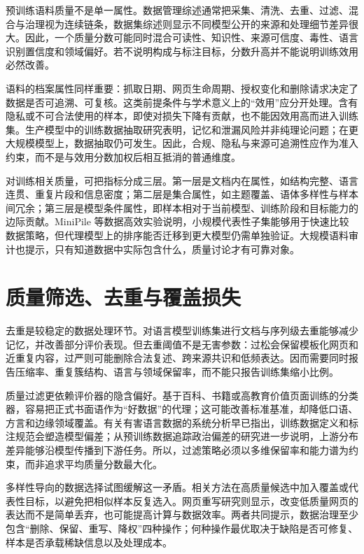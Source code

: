 \documentclass[11pt,a4paper]{article}
\begin{document}
预训练语料质量不是单一属性。数据管理综述通常把采集、清洗、去重、过滤、混合与治理视为连续链条\cite{datamanagementfor2023}，数据集综述则显示不同模型公开的来源和处理细节差异很大\cite{datasetsforlarge2024}。因此，一个质量分数可能同时混合可读性、知识性、来源可信度、毒性、语言识别置信度和领域偏好。若不说明构成与标注目标，分数升高并不能说明训练效用必然改善。

语料的档案属性同样重要：抓取日期、网页生命周期、授权变化和删除请求决定了数据是否可追溯、可复核\cite{anarchivalperspective2024}。这类前提条件与学术意义上的“效用”应分开处理。含有隐私或不可合法使用的样本，即使对损失下降有贡献，也不能因效用高而进入训练集。生产模型中的训练数据抽取研究表明，记忆和泄漏风险并非纯理论问题\cite{extractingtrainingdata2020}；在更大规模模型上，数据抽取仍可发生\cite{scalableextractionof2023}。因此，合规、隐私与来源可追溯性应作为准入约束，而不是与效用分数加权后相互抵消的普通维度。

对训练相关质量，可把指标分成三层。第一层是文档内在属性，如结构完整、语言连贯、重复片段和信息密度；第二层是集合属性，如主题覆盖、语体多样性与样本间冗余；第三层是模型条件属性，即样本相对于当前模型、训练阶段和目标能力的边际贡献。MiniPile 等数据高效实验说明，小规模代表性子集能够用于快速比较数据策略\cite{theminipilechallenge2023}，但代理模型上的排序能否迁移到更大模型仍需单独验证。大规模语料审计也提示，只有知道数据中实际包含什么，质量讨论才有可靠对象\cite{whatsin2023}。

\section{质量筛选、去重与覆盖损失}

去重是较稳定的数据处理环节。对语言模型训练集进行文档与序列级去重能够减少记忆，并改善部分评价表现\cite{deduplicatingtrainingdata2022}。但去重阈值不是无害参数：过松会保留模板化网页和近重复内容，过严则可能删除合法复述、跨来源共识和低频表达。因而需要同时报告压缩率、重复簇结构、语言与领域保留率，而不能只报告训练集缩小比例。

质量过滤更依赖评价器的隐含偏好。基于百科、书籍或高教育价值页面训练的分类器，容易把正式书面语作为“好数据”的代理；这可能改善标准基准，却降低口语、方言和边缘领域覆盖。有关有害语言数据的系统分析早已指出，训练数据定义和标注规范会塑造模型偏差\cite{directionsinabusive2020}；从预训练数据追踪政治偏差的研究进一步说明，上游分布差异能够沿模型传播到下游任务\cite{frompretrainingdata2023}。所以，过滤策略必须以多维保留率和能力谱为约束，而非追求平均质量分数最大化。

多样性导向的数据选择试图缓解这一矛盾。相关方法在高质量候选中加入覆盖或代表性目标，以避免把相似样本反复选入\cite{harnessingdiversityfor2024}。网页重写研究则显示，改变低质量网页的表达而不是简单丢弃，也可能提高计算与数据效率\cite{rephrasingtheweb2024}。两者共同提示，数据治理至少包含“删除、保留、重写、降权”四种操作；何种操作最优取决于缺陷是否可修复、样本是否承载稀缺信息以及处理成本。
\end{document}
